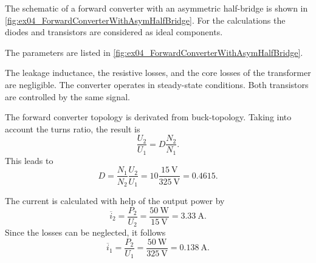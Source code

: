 

The schematic of a forward converter with an asymmetric half-bridge is shown in \autoref{fig:ex04_ForwardConverterWithAsymHalfBridge}. 
For the calculations the diodes and transistors are considered as ideal components.



The parameters are listed in \autoref{fig:ex04_ForwardConverterWithAsymHalfBridge}.


\FloatBarrier
The leakage inductance, the resistive losses, and the core losses of the transformer are negligible. 
The converter operates in steady-state conditions. Both transistors are controlled by the same signal.

\begin{solutionblock}
    The forward converter topology is derivated from buck-topology. Taking into account the turns ratio, the result is
    \begin{equation}
        \frac{U_\mathrm{2}}{U_\mathrm{1}}=D\frac{N_\mathrm{2}}{N_\mathrm{1}}.
        \label{eq:ex04voltageratioforwardconverter}
    \end{equation}
    This leads to
    \begin{equation}
        D=\frac{N_\mathrm{1}}{N_\mathrm{2}}\frac{U_\mathrm{2}}{U_\mathrm{1}}=10\frac{\SI{15}{\volt}}{\SI{325}{\volt}}=0.4615.
    \end{equation}
\end{solutionblock}

\begin{solutionblock}
    The current is calculated with help of the output power by
    \begin{equation}
        \overline{i}_\mathrm{2}=\frac{P_\mathrm{2}}{U_\mathrm{2}}=\frac{\SI{50}{\watt}}{\SI{15}{\volt}}=\SI{3.33}{\ampere}.
        \label{eq:ex04averageoutputcurrent}
    \end{equation}
    Since the losses can be neglected, it follows
    \begin{equation}
        \overline{i}_\mathrm{1}=\frac{P_\mathrm{2}}{U_\mathrm{1}}=\frac{\SI{50}{\watt}}{\SI{325}{\volt}}=\SI{0.138}{\ampere}.
    \end{equation}
\end{solutionblock}


